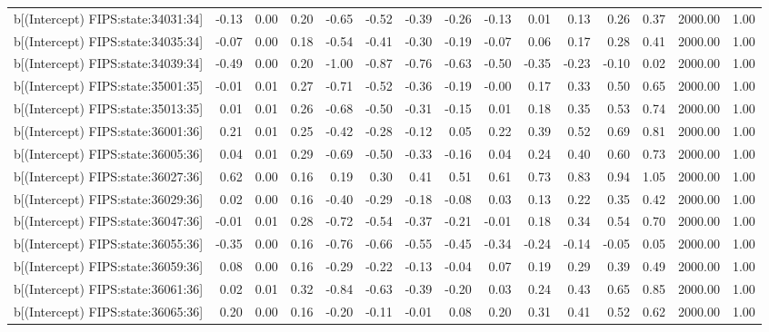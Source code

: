 \begin{table}[ht]
\begin{tabular}{rrrrrrrrrrrrrrr}
  b[(Intercept) FIPS:state:34031:34] & -0.13 & 0.00 & 0.20 & -0.65 & -0.52 & -0.39 & -0.26 & -0.13 & 0.01 & 0.13 & 0.26 & 0.37 & 2000.00 & 1.00 \\ 
  b[(Intercept) FIPS:state:34035:34] & -0.07 & 0.00 & 0.18 & -0.54 & -0.41 & -0.30 & -0.19 & -0.07 & 0.06 & 0.17 & 0.28 & 0.41 & 2000.00 & 1.00 \\ 
  b[(Intercept) FIPS:state:34039:34] & -0.49 & 0.00 & 0.20 & -1.00 & -0.87 & -0.76 & -0.63 & -0.50 & -0.35 & -0.23 & -0.10 & 0.02 & 2000.00 & 1.00 \\ 
  b[(Intercept) FIPS:state:35001:35] & -0.01 & 0.01 & 0.27 & -0.71 & -0.52 & -0.36 & -0.19 & -0.00 & 0.17 & 0.33 & 0.50 & 0.65 & 2000.00 & 1.00 \\ 
  b[(Intercept) FIPS:state:35013:35] & 0.01 & 0.01 & 0.26 & -0.68 & -0.50 & -0.31 & -0.15 & 0.01 & 0.18 & 0.35 & 0.53 & 0.74 & 2000.00 & 1.00 \\ 
  b[(Intercept) FIPS:state:36001:36] & 0.21 & 0.01 & 0.25 & -0.42 & -0.28 & -0.12 & 0.05 & 0.22 & 0.39 & 0.52 & 0.69 & 0.81 & 2000.00 & 1.00 \\ 
  b[(Intercept) FIPS:state:36005:36] & 0.04 & 0.01 & 0.29 & -0.69 & -0.50 & -0.33 & -0.16 & 0.04 & 0.24 & 0.40 & 0.60 & 0.73 & 2000.00 & 1.00 \\ 
  b[(Intercept) FIPS:state:36027:36] & 0.62 & 0.00 & 0.16 & 0.19 & 0.30 & 0.41 & 0.51 & 0.61 & 0.73 & 0.83 & 0.94 & 1.05 & 2000.00 & 1.00 \\ 
  b[(Intercept) FIPS:state:36029:36] & 0.02 & 0.00 & 0.16 & -0.40 & -0.29 & -0.18 & -0.08 & 0.03 & 0.13 & 0.22 & 0.35 & 0.42 & 2000.00 & 1.00 \\ 
  b[(Intercept) FIPS:state:36047:36] & -0.01 & 0.01 & 0.28 & -0.72 & -0.54 & -0.37 & -0.21 & -0.01 & 0.18 & 0.34 & 0.54 & 0.70 & 2000.00 & 1.00 \\ 
  b[(Intercept) FIPS:state:36055:36] & -0.35 & 0.00 & 0.16 & -0.76 & -0.66 & -0.55 & -0.45 & -0.34 & -0.24 & -0.14 & -0.05 & 0.05 & 2000.00 & 1.00 \\ 
  b[(Intercept) FIPS:state:36059:36] & 0.08 & 0.00 & 0.16 & -0.29 & -0.22 & -0.13 & -0.04 & 0.07 & 0.19 & 0.29 & 0.39 & 0.49 & 2000.00 & 1.00 \\ 
  b[(Intercept) FIPS:state:36061:36] & 0.02 & 0.01 & 0.32 & -0.84 & -0.63 & -0.39 & -0.20 & 0.03 & 0.24 & 0.43 & 0.65 & 0.85 & 2000.00 & 1.00 \\ 
  b[(Intercept) FIPS:state:36065:36] & 0.20 & 0.00 & 0.16 & -0.20 & -0.11 & -0.01 & 0.08 & 0.20 & 0.31 & 0.41 & 0.52 & 0.62 & 2000.00 & 1.00 \\ 

\end{tabular}
\end{table}
